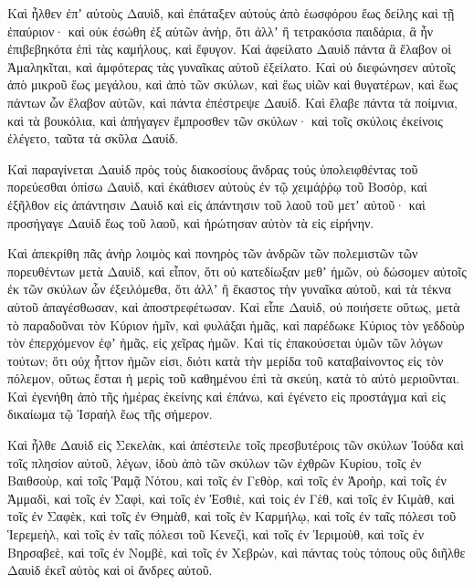 {Καὶ ἦλθεν ἐπʼ αὐτοὺς Δαυὶδ, καὶ ἐπάταξεν αὐτοὺς ἀπὸ ἑωσφόρου ἕως δείλης καὶ τῇ ἐπαύριον· καὶ οὐκ ἐσώθη ἐξ αὐτῶν ἀνὴρ, ὅτι ἀλλʼ ἢ τετρακόσια παιδάρια, ἃ ἦν ἐπιβεβηκότα ἐπὶ τὰς καμήλους, καὶ ἔφυγον.
Καὶ ἀφείλατο Δαυὶδ πάντα ἃ ἔλαβον οἱ Ἀμαληκῖται, καὶ ἀμφότερας τὰς γυναῖκας αὐτοῦ ἐξείλατο.
Καὶ οὐ διεφώνησεν αὐτοῖς ἀπὸ μικροῦ ἕως μεγάλου, καὶ ἀπὸ τῶν σκύλων, καὶ ἕως υἱῶν καὶ θυγατέρων, καὶ ἕως πάντων ὧν ἔλαβον αὐτῶν, καὶ πάντα ἐπέστρεψε Δαυίδ.
Καὶ ἔλαβε πάντα τὰ ποίμνια, καὶ τὰ βουκόλια, καὶ ἀπήγαγεν ἔμπροσθεν τῶν σκύλων· καὶ τοῖς σκύλοις ἐκείνοις ἐλέγετο, ταῦτα τὰ σκῦλα Δαυίδ.
\par }{\PP {}Καὶ παραγίνεται Δαυὶδ πρὸς τοὺς διακοσίους ἄνδρας τούς ὑπολειφθέντας τοῦ πορεύεσθαι ὀπίσω Δαυὶδ, καὶ ἐκάθισεν αὐτοὺς ἐν τῷ χειμάῤῥῳ τοῦ Βοσὸρ, καὶ ἐξῆλθον εἰς ἀπάντησιν Δαυὶδ καὶ εἰς ἀπάντησιν τοῦ λαοῦ τοῦ μετʼ αὐτοῦ· καὶ προσήγαγε Δαυὶδ ἕως τοῦ λαοῦ, καὶ ἠρώτησαν αὐτὸν τὰ εἰς εἰρήνην.
\par }{\PP {}Καὶ ἀπεκρίθη πᾶς ἀνὴρ λοιμὸς καὶ πονηρὸς τῶν ἀνδρῶν τῶν πολεμιστῶν τῶν πορευθέντων μετὰ Δαυὶδ, καὶ εἶπον, ὅτι οὐ κατεδίωξαν μεθʼ ἡμῶν, οὐ δώσομεν αὐτοῖς ἐκ τῶν σκύλων ὧν ἐξειλόμεθα, ὅτι ἀλλʼ ἢ ἕκαστος τὴν γυναῖκα αὐτοῦ, καὶ τὰ τέκνα αὐτοῦ ἀπαγέσθωσαν, καὶ ἀποστρεφέτωσαν.
Καὶ εἶπε Δαυὶδ, οὐ ποιήσετε οὕτως, μετὰ τὸ παραδοῦναι τὸν Κύριον ἡμῖν, καὶ φυλάξαι ἡμᾶς, καὶ παρέδωκε Κύριος τὸν γεδδοὺρ τὸν ἐπερχόμενον ἐφʼ ἡμᾶς, εἰς χεῖρας ἡμῶν.
Καὶ τίς ἐπακούσεται ὑμῶν τῶν λόγων τούτων; ὅτι οὐχ ἧττον ἡμῶν εἰσι, διότι κατὰ τὴν μερίδα τοῦ καταβαίνοντος εἰς τὸν πόλεμον, οὕτως ἔσται ἡ μερὶς τοῦ καθημένου ἐπὶ τὰ σκεύη, κατὰ τὸ αὐτὸ μεριοῦνται.
Καὶ ἐγενήθη ἀπὸ τῆς ἡμέρας ἐκείνης καὶ ἐπάνω, καὶ ἐγένετο εἰς προστάγμα καὶ εἱς δικαίωμα τῷ Ἰσραὴλ ἕως τῆς σήμερον.
\par }{\PP {}Καὶ ἦλθε Δαυὶδ εἰς Σεκελὰκ, καὶ ἀπέστειλε τοῖς πρεσβυτέροις τῶν σκύλων Ἰούδα καὶ τοῖς πλησίον αὐτοῦ, λέγων, ἰδοὺ ἀπὸ τῶν σκύλων τῶν ἐχθρῶν Κυρίου,
τοῖς ἐν Βαιθσοὺρ, καὶ τοῖς Ῥαμᾷ Νότου, καὶ τοῖς ἐν Γεθὸρ,
καὶ τοῖς ἐν Ἀροὴρ, καὶ τοῖς ἐν Ἀμμαδὶ, καὶ τοῖς ἐν Σαφὶ, καὶ τοῖς ἐν Ἐσθιὲ,
καὶ τοὶς ἐν Γὲθ, καὶ τοῖς ἐν Κιμὰθ, καὶ τοῖς ἐν Σαφὲκ, καὶ τοῖς ἐν Θημὰθ,
καὶ τοῖς ἐν Καρμήλῳ, καὶ τοῖς ἐν ταῖς πόλεσι τοῦ Ἱερεμεὴλ, καὶ τοῖς ἐν ταῖς πόλεσι τοῦ Κενεζὶ,
καὶ τοῖς ἐν Ἱεριμοὺθ, καὶ τοῖς ἐν Βηρσαβεὲ, καὶ τοῖς ἐν Νομβὲ,
καὶ τοῖς ἐν Χεβρὼν, καὶ πάντας τοὺς τόπους οὓς διῆλθε Δαυὶδ ἐκεῖ αὐτὸς καὶ οἱ ἄνδρες αὐτοῦ.

}
